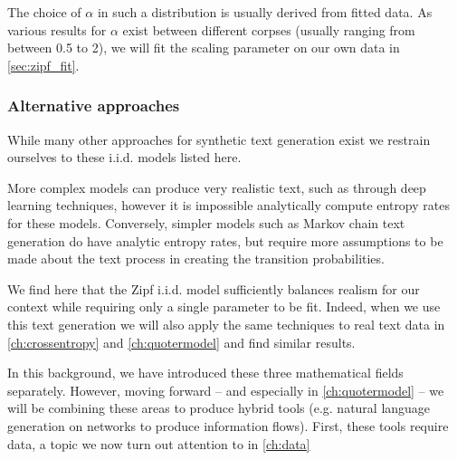 The choice of $\alpha$ in such a distribution is usually derived from fitted data. As various results for $\alpha$ exist between different corpses (usually ranging from between 0.5 to 2), we will fit the scaling parameter on our own data in \autoref{sec:zipf_fit}.

\subsubsection{Alternative approaches}
While many other approaches for synthetic text generation exist we restrain ourselves to these i.i.d. models listed here. 

More complex models can produce very realistic text, such as through deep learning techniques, however it is impossible analytically compute entropy rates for these models. Conversely, simpler models such as Markov chain text generation do have analytic entropy rates, but require more assumptions to be made about the text process in creating the transition probabilities. 

We find here that the Zipf i.i.d. model sufficiently balances realism for our context while requiring only a single parameter to be fit. Indeed, when we use this text generation we will also apply the same techniques to real text data in \autoref{ch:crossentropy} and \autoref{ch:quotermodel} and find similar results. 


In this background, we have introduced these three mathematical fields separately. However, moving forward -- and especially in \autoref{ch:quotermodel} -- we will be combining these areas to produce hybrid tools (e.g.  natural language generation on networks to produce information flows). First, these tools require data, a topic we now turn out attention to in \autoref{ch:data}

